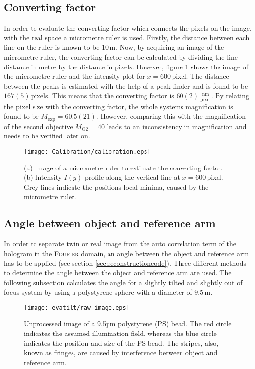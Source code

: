 \documentclass{article}
\begin{document}
\subsection{Converting factor}
In order to evaluate the converting factor which connects the pixels on the image, with the real space a micrometre ruler is used. Firstly, the distance between each line on the ruler is known to be $10\,$\textmu m. Now, by acquiring an image of the micrometre ruler, the converting factor can be calculated by dividing the line distance in metre by the distance in pixels. However, figure \ref{fig:calibration} shows the image of the micrometre ruler and the intensity plot for $x=600$\,pixel. The distance between the peaks is estimated with the help of a peak finder and is found to be $167(5)\,$pixels. This means that the converting factor is $60(2)\,\frac{\text{nm}}{\text{pixel}}$. By relating the pixel size with the converting factor, the whole systems magnification is found to be $M_\text{exp}=60.5(21)$. However, comparing this with the magnification of the second objective $M_\text{O2}=40$ leads to an inconsistency in magnification and needs to be verified later on.
\begin{figure}
    \centering
    \texttt{[image: Calibration/calibration.eps]}
    \caption{(a) Image of a micrometre ruler to estimate the converting factor.\\
    (b) Intensity $I(y)$ profile along the vertical line at $x=600\,$pixel. Grey lines indicate the positions local minima, caused by the micrometre ruler.}
    \label{fig:calibration}
\end{figure}

\subsection{Angle between object and reference arm} \label{sec:tilt}
In order to separate twin or real image from the auto correlation term of the hologram in the \textsc{Fourier} domain, an angle between the object and reference arm has to be applied (see section \ref{sec:reconstructioncode}).
Three different methods to determine the angle between the object and reference arm are used. The following subsection calculates the angle for a slightly tilted and slightly out of focus system by using a polystyrene sphere with a diameter of $9.5\,$\textmu m.
\begin{figure}
    \centering
    \texttt{[image: evatilt/raw\_image.eps]}
    \caption{Unprocessed image of a 9.5µm polystyrene (PS) bead. The red circle indicates the assumed illumination field, whereas the blue circle indicates the position and size of the PS bead. The stripes, also, known as fringes, are caused by interference between object and reference arm.}
    \label{fig:raw_image}
\end{figure}
\end{document}
